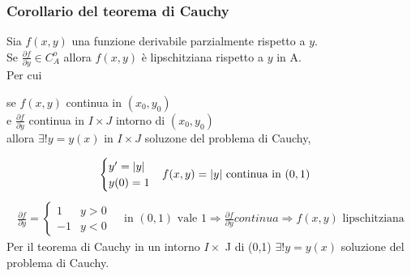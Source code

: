 \subsubsection{Corollario del teorema di Cauchy}
\begin{defi}
  Sia $f(x,y)$ una funzione derivabile parzialmente rispetto a $y$.\\
  Se $\frac{\partial f}{\partial y}\in C_A^o$ allora $f(x,y)$ è lipschitziana rispetto a
  $y$ in A.\\
  Per cui
  \begin{center}
    se $f(x,y)$ continua in $(x_0,y_0)$\\
    e $\frac{\partial f}{\partial y}$ continua in $I\times J$ intorno di $(x_0,y_0)$\\
    allora $\exists! y=y(x)$ in $I\times J$ soluzone del problema di Cauchy,
  \end{center}
\end{defi}
\begin{esempio}
  \begin{eqnarray*}
    \begin{cases}
      y^\prime=\lvert y\rvert\\
      y(0)=1
    \end{cases} & f(x,y)=\lvert y\rvert \text{ continua in }(0,1)
  \end{eqnarray*}
  \begin{eqnarray*}
    \frac{\partial f}{\partial y}=\begin{cases}
                                    1 & y>0\\
                                    -1 & y<0
                                  \end{cases}
    & \text{ in } (0,1) \text{ vale } 1 \Rightarrow \frac{\partial f}{\partial y}
      continua \Rightarrow f(x,y)\text{ lipschitziana}
  \end{eqnarray*}
  Per il teorema di Cauchy in un intorno $I\times$ J di (0,1) $\exists! y=y(x)$ soluzione
  del problema di Cauchy.
\end{esempio}
